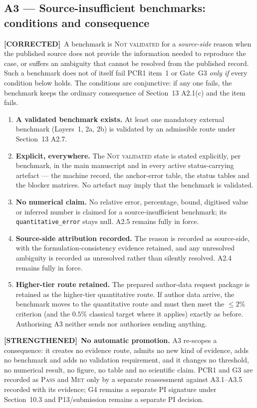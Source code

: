 \documentclass[11pt,a4paper]{article}
\newcommand{\STR}{{\color{strcol}\textbf{[STRENGTHENED]}}}
\newcommand{\COR}{{\color{corcol}\textbf{[CORRECTED]}}}
\begin{document}
\subsection*{A3 --- Source-insufficient benchmarks: conditions and consequence}
\COR\ A benchmark is \textsc{Not validated} for a \emph{source-side} reason when the published
source does not provide the information needed to reproduce the case, or suffers an ambiguity that
cannot be resolved from the published record. Such a benchmark does not of itself fail PCR1
item~1 or Gate~G3 \emph{only if} every condition below holds. The conditions are conjunctive: if
any one fails, the benchmark keeps the ordinary consequence of Section~13 A2.1(c) and the item
fails.
\begin{enumerate}[label=\textbf{A3.\arabic*.}, leftmargin=*]
\item \textbf{A validated benchmark exists.} At least one mandatory external benchmark
(Layers~1, 2a, 2b) is validated by an admissible route under Section~13 A2.7.
\item \textbf{Explicit, everywhere.} The \textsc{Not validated} state is stated explicitly, per
benchmark, in the main manuscript and in every active status-carrying artefact --- the machine
record, the anchor-error table, the status tables and the blocker matrices. No artefact may
imply that the benchmark is validated.
\item \textbf{No numerical claim.} No relative error, percentage, bound, digitised value or
inferred number is claimed for a source-insufficient benchmark; its
\texttt{quantitative\_error} stays null. A2.5 remains fully in force.
\item \textbf{Source-side attribution recorded.} The reason is recorded as source-side, with the
formulation-consistency evidence retained, and any unresolved ambiguity is recorded as
unresolved rather than silently resolved. A2.4 remains fully in force.
\item \textbf{Higher-tier route retained.} The prepared author-data request package is retained
as the higher-tier quantitative route. If author data arrive, the benchmark moves to the
quantitative route and must then meet the $\le2\%$ criterion (and the $0.5\%$ classical target
where it applies) exactly as before. Authorising A3 neither sends nor authorises sending
anything.
\end{enumerate}
\STR\ \textbf{No automatic promotion.} A3 re-scopes a consequence: it creates no evidence route,
admits no new kind of evidence, adds no benchmark and adds no validation requirement, and it
changes no threshold, no numerical result, no figure, no table and no scientific claim. PCR1 and
G3 are recorded as \textsc{Pass} and \textsc{Met} only by a separate reassessment against
A3.1--A3.5 recorded with its evidence; G4 remains a separate PI signature under Section~10.3 and
P13/submission remains a separate PI decision.
\end{document}
